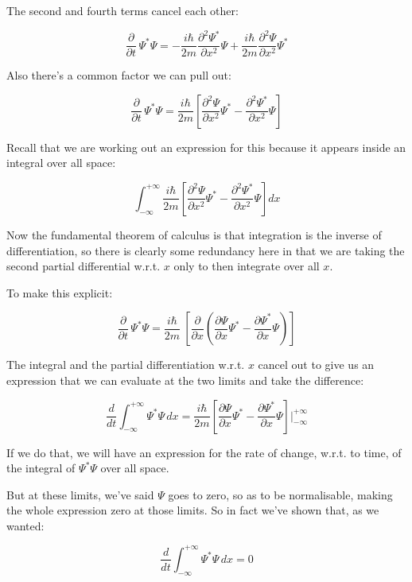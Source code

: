 The second and fourth terms cancel each other:

$$
\frac{\partial}{\partial t} \, \Psi^*\Psi
=
- \frac{i \hbar}{2m} \frac{\partial^2 \Psi^*}{\partial x^2}
\Psi
+
\frac{i \hbar}{2m} \frac{\partial^2 \Psi}{\partial x^2}
\Psi^*
$$

Also there's a common factor we can pull out:

$$
\frac{\partial}{\partial t} \, \Psi^*\Psi
=
\frac{i \hbar}{2m}
\left[
\frac{\partial^2 \Psi}{\partial x^2}\Psi^*
- \frac{\partial^2 \Psi^*}{\partial x^2}\Psi
\right]
$$

Recall that we are working out an expression for this because it appears inside an integral over all space:

$$
\int_{-\infty}^{+\infty}
\frac{i \hbar}{2m}
\left[
\frac{\partial^2 \Psi}{\partial x^2}\Psi^*
- \frac{\partial^2 \Psi^*}{\partial x^2}\Psi
\right]
dx
$$

Now the fundamental theorem of calculus is that integration is the inverse of differentiation, so there is clearly some redundancy here in that we are taking the second partial differential w.r.t. $x$ only to then integrate over all $x$.

To make this explicit:

\begin{equation}  
\frac{\partial}{\partial t} \, \Psi^*\Psi
=
\frac{i \hbar}{2m} \
\left[
\frac{\partial}{\partial x}
\left(
\frac{\partial \Psi}{\partial x}\Psi^*
- \frac{\partial \Psi^*}{\partial x}\Psi
\right)
\right]
\label{eqn:qm-byparts}
\end{equation}

The integral and the partial differentiation w.r.t. $x$ cancel out to give us an expression that we can evaluate at the two limits and take the difference:

$$
\frac{d}{d t}
\int_{-\infty}^{+\infty}
\Psi^*\Psi
\,dx
=
\frac{i \hbar}{2m}
\left[
\frac{\partial \Psi}{\partial x}\Psi^*
- \frac{\partial \Psi^*}{\partial x}\Psi
\right]
\bigg\rvert_{-\infty}^{+\infty}
$$

If we do that, we will have an expression for the rate of change, w.r.t. to time, of the integral of $\Psi^*\Psi$ over all space.

But at these limits, we've said $\Psi$ goes to zero, so as to be normalisable, making the whole expression zero at those limits. So in fact we've shown that, as we wanted:

$$
\frac{d}{d t}
\int_{-\infty}^{+\infty}
\Psi^*\Psi
\,dx
= 0
$$

